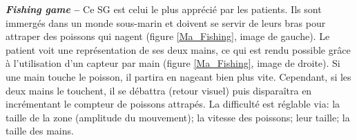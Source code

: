 		\begin{minipage}{\linewidth}
			\label{Ma_CatchOrange}
		\end{minipage}\medskip
		
		\textbf{\textit{Fishing game} --} Ce SG est celui le plus apprécié par les patients. Ils sont immergés dans un monde sous-marin et doivent se servir de leurs bras pour attraper des poissons qui nagent (figure \ref{Ma_Fishing}, image de gauche). Le patient voit une représentation de ses deux mains, ce qui est rendu possible grâce à l'utilisation d'un capteur par main (figure \ref{Ma_Fishing}, image de droite). Si une main touche le poisson, il partira en nageant bien plus vite. Cependant, si les deux mains le touchent, il se débattra (retour visuel) puis disparaîtra en incrémentant le compteur de poissons attrapés. La difficulté est réglable via: la taille de la zone (amplitude du mouvement); la vitesse des poissons; leur taille; la taille des mains.

		\begin{minipage}{\linewidth}
			\label{Ma_Fishing}
		\end{minipage}\medskip
		
